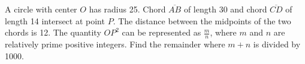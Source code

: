 A circle with center $O$ has radius 25. Chord $\overline{AB}$ of length 30 and chord $\overline{CD}$ of length 14 intersect at point $P$. The distance between the midpoints of the two chords is 12. The quantity $OP^2$ can be represented as $\frac{m}{n}$, where $m$ and $n$ are relatively prime positive integers. Find the remainder where $m+n$ is divided by 1000.